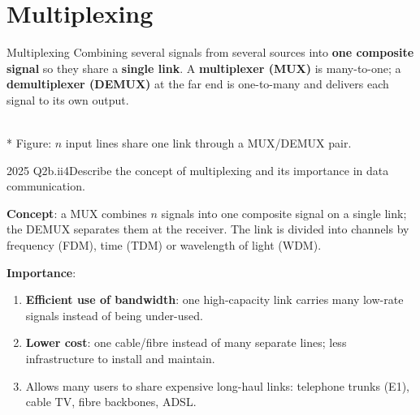 \documentclass[10pt]{article}
\begin{document}
\section{Multiplexing}

\begin{keydef}{Multiplexing}
Combining several signals from several sources into \textbf{one composite signal} so they share a \textbf{single link}. A \textbf{multiplexer (MUX)} is many-to-one; a \textbf{demultiplexer (DEMUX)} at the far end is one-to-many and delivers each signal to its own output.
\end{keydef}

\begin{center}
\begin{minipage}{\linewidth}\centering
{}\\*
{\scriptsize\color{midgrey}Figure: $n$ input lines share one link through a MUX/DEMUX pair.}\end{minipage}
\end{center}

\begin{pastq}{2025 Q2b.ii}{4}Describe the concept of multiplexing and its importance in data communication.\end{pastq}
\begin{ans}
\textbf{Concept}: a MUX combines $n$ signals into one composite signal on a single link; the DEMUX separates them at the receiver. The link is divided into channels by frequency (FDM), time (TDM) or wavelength of light (WDM).

\textbf{Importance}:
\begin{enumerate}
\item \textbf{Efficient use of bandwidth}: one high-capacity link carries many low-rate signals instead of being under-used.
\item \textbf{Lower cost}: one cable/fibre instead of many separate lines; less infrastructure to install and maintain.
\item Allows many users to share expensive long-haul links: telephone trunks (E1), cable TV, fibre backbones, ADSL.
\end{enumerate}
\end{ans}
\end{document}
